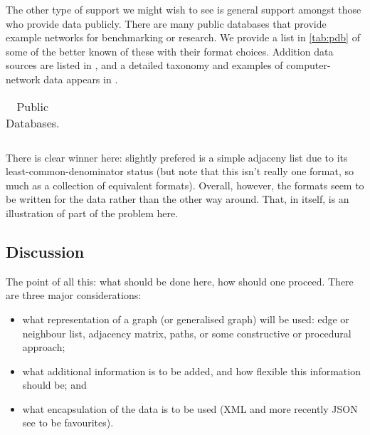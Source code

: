 \documentclass{sig-alternate}
\begin{document}
The other type of support we might wish to see is general support
amongst those who provide data publicly. There are many public
databases that provide example networks for benchmarking or
research. We provide a list in \autoref{tab:pdb} of some of the better
known of these with their format choices. Addition data sources are
listed in \cite{alhajj14:_sourc_networ_data}, and a detailed taxonomy
and examples of computer-network data appears in
\cite{battista13:_handb_graph_drawin_visual}.

\begin{table*}[p]
  \centering
  {\small
    \begin{tabular}{r|ll}
      
      \hline
       
    \end{tabular} 
  } 
  \caption{Public Databases.}
  \label{tab:pdb}
\end{table*}

There is clear winner here: slightly prefered is a simple adjaceny
list due to its least-common-denominator status (but note that this
isn't really one format, so much as a collection of equivalent
formats). Overall, however, the formats seem to be written for the
data rather than the other way around. That, in itself, is an
illustration of part of the problem here.

\subsection{Discussion}

The point of all this: what should be done here, how should one
proceed. There are three major considerations:
\begin{itemize}
\item what representation of a graph (or generalised graph) will be
  used: edge or neighbour list, adjacency matrix, paths, or some
  constructive or procedural approach;  
\item what additional information is to be added, and how flexible
  this information should be; and
\item what encapsulation of the data is to be used (XML and more
  recently JSON see to be favourites). 
\end{itemize}
\end{document}
